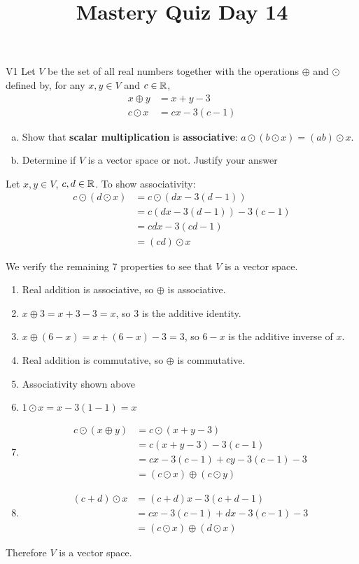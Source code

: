 \documentclass{sbgLAquiz}
\title{Mastery Quiz Day 14 }
\begin{document}
\begin{problem}{V1}
Let $V$ be the  set of all real numbers together with the operations $\oplus$ and $\odot$ defined by, for any $x,y \in V$ and $c \in \mathbb{R}$,
\begin{align*}
x\oplus y  &= x+y-3 \\
c \odot x &= cx-3(c-1)
\end{align*}
\begin{enumerate}[(a)]
\item Show that \textbf{scalar multiplication} is
      \textbf{associative}: \(a\odot(b\odot x)=(ab)\odot x\).
\item Determine if $V$ is a vector space or not.  Justify your answer
\end{enumerate}
\end{problem}

\begin{solution}
Let $x,y \in V$, $c,d \in \mathbb{R}$.
To show associativity:
\begin{align*}
c\odot \left( d \odot x\right) &= c\odot \left( dx-3(d-1) \right) \\
&= c\left(dx-3(d-1)\right)-3(c-1) \\
&= cdx-3(cd-1) \\
&= (cd) \odot x
\end{align*}

We verify the remaining 7 properties to see that $V$ is a vector space.
\begin{enumerate}[1)]
\item Real addition is associative, so $\oplus$ is associative.
\item $x\oplus 3 = x+3-3=x$, so $3$ is the additive identity.
\item $x \oplus (6-x) = x+(6-x)-3=3$, so $6-x$ is the additive inverse of $x$.
\item Real addition is commutative, so $\oplus$ is commutative.
\item Associativity shown above
\item $1 \odot x = x-3(1-1)=x$
\item \begin{align*} c \odot (x \oplus y) &=
c \odot (x+y-3) \\
&= c(x+y-3)-3(c-1) \\
&= cx-3(c-1) + cy-3(c-1) -3 \\
&= (c\odot x ) \oplus (c\odot y)
\end{align*}
\item \begin{align*} (c+d) \odot x &= (c+d)x-3(c+d-1) \\
&= cx-3(c-1)+dx-3(c-1)-3 \\
&= (c\odot x ) \oplus (d \odot x)
\end{align*}
\end{enumerate}

Therefore $V$ is a vector space.
\end{solution}
\end{document}
